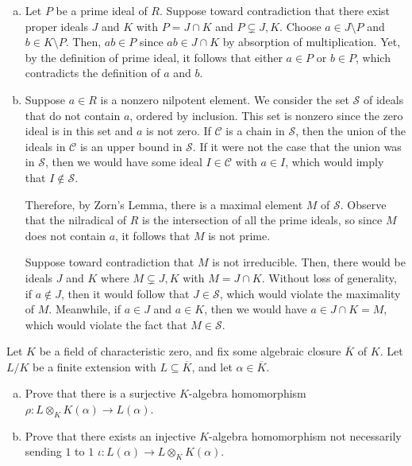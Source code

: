 \documentclass[10pt]{mypackage}
\begin{document}
\begin{solution}\hfill
  \begin{enumerate}[(a)]
    \item Let $P$ be a prime ideal of $R$. Suppose toward contradiction that there exist proper ideals $J$ and $K$ with $P = J\cap K$ and $P\subsetneq J,K$. Choose $a\in J\setminus P$ and $b\in K\setminus P$. Then, $ab\in P$ since $ab\in J\cap K$ by absorption of multiplication. Yet, by the definition of prime ideal, it follows that either $a\in P$ or $b\in P$, which contradicts the definition of $a$ and $b$.
    \item Suppose $a\in R$ is a nonzero nilpotent element. We consider the set $\mathcal{S}$  of ideals that do not contain $a$, ordered by inclusion. This set is nonzero since the zero ideal is in this set and $a$ is not zero. If $\mathcal{C}$ is a chain in $\mathcal{S}$, then the union of the ideals in $\mathcal{C}$ is an upper bound in $\mathcal{S}$. If it were not the case that the union was in $\mathcal{S}$, then we would have some ideal $I\in \mathcal{C}$ with $a\in I$, which would imply that $I\notin \mathcal{S}$.

      Therefore, by Zorn's Lemma, there is a maximal element $M$ of $\mathcal{S}$. Observe that the nilradical of $R$ is the intersection of all the prime ideals, so since $M$ does not contain $a$, it follows that $M$ is not prime.

      Suppose toward contradiction that $M$ is not irreducible. Then, there would be ideals $J$ and $K$ where $M\subsetneq J,K$ with $M = J\cap K$. Without loss of generality, if $a\notin J$, then it would follow that $J\in \mathcal{S}$, which would violate the maximality of $M$. Meanwhile, if $a\in J$ and $a\in K$, then we would have $a\in J\cap K = M$, which would violate the fact that $M\in \mathcal{S}$.
  \end{enumerate}
\end{solution}
\begin{problem}[Problem 6]
  Let $K$ be a field of characteristic zero, and fix some algebraic closure $ \overline{K} $ of $K$. Let $L/K$ be a finite extension with $L\subseteq \overline{K}$, and let $\alpha\in \overline{K}$.
  \begin{enumerate}[(a)]
    \item Prove that there is a surjective $K$-algebra homomorphism $\rho\colon L\otimes_{K}K\left( \alpha \right)\rightarrow L\left( \alpha \right)$.
    \item Prove that there exists an injective $K$-algebra homomorphism not necessarily sending $1$ to $1$ $\iota\colon L\left( \alpha \right)\rightarrow L\otimes_{K}K\left( \alpha \right)$.
  \end{enumerate}
\end{problem}
\end{document}
